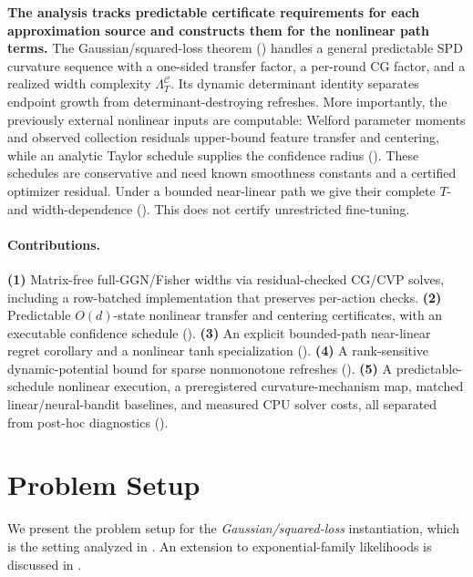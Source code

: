 \documentclass[twoside]{article}
\newcommand{\Calg}{\mathcal{C}}                 %
\newcommand{\Lamalg}{\Lambda^{\Calg}}           %
\begin{document}
\textbf{The analysis tracks predictable certificate requirements for each
approximation source and constructs them for the nonlinear path terms.}  The Gaussian/squared-loss theorem
() handles a general predictable SPD curvature sequence with a
one-sided transfer factor, a per-round CG factor, and a realized width complexity
$\Lamalg_T$.  Its dynamic determinant identity separates endpoint growth from
determinant-destroying refreshes.  More importantly, the previously external
nonlinear inputs are computable: Welford parameter moments and observed collection
residuals upper-bound feature transfer and centering, while an analytic Taylor
schedule supplies the confidence radius ().
These schedules are conservative and need known smoothness constants and a certified
optimizer residual.  Under a bounded near-linear path we give their complete
$T$- and width-dependence ().  This does not certify
unrestricted fine-tuning.

\paragraph{Contributions.}
\textbf{(1)} Matrix-free full-GGN/Fisher widths via residual-checked CG/CVP solves,
including a row-batched implementation that preserves per-action checks.
\textbf{(2)} Predictable $O(d)$-state nonlinear transfer and centering certificates,
with an executable confidence schedule ().
\textbf{(3)} An explicit bounded-path near-linear regret corollary and a nonlinear
tanh specialization ().
\textbf{(4)} A rank-sensitive dynamic-potential bound for sparse nonmonotone
refreshes ().
\textbf{(5)} A predictable-schedule nonlinear execution, a preregistered
curvature-mechanism map, matched linear/neural-bandit baselines, and measured CPU
solver costs, all separated from post-hoc diagnostics ().

\section{Problem Setup}\label{sec:problem}

We present the problem setup for the \emph{Gaussian/squared-loss}
instantiation, which is the setting analyzed in .
An extension to exponential-family likelihoods is discussed in
.
\end{document}
